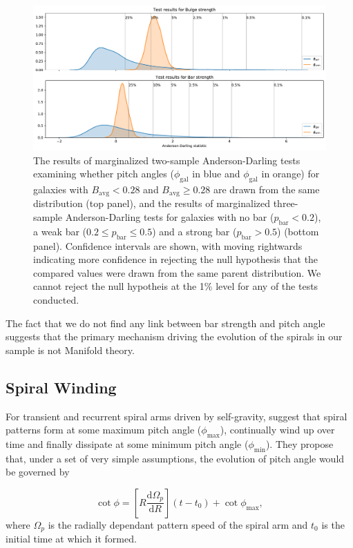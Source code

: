 \begin{figure}
  \includegraphics[width=17.7cm]{plots/bulge_bar_test_results.pdf}
  \caption{The results of marginalized two-sample Anderson-Darling tests examining whether pitch angles ($\phi_\mathrm{gal}$ in blue and $\phi_\mathrm{gal}$ in orange) for galaxies with $B_\mathrm{avg} < 0.28$ and $B_\mathrm{avg} \ge 0.28$ are drawn from the same distribution (top panel), and the results of marginalized three-sample Anderson-Darling tests for galaxies with no bar ($p_\mathrm{bar} < 0.2$), a weak bar ($0.2 \le p_\mathrm{bar} \le 0.5$) and a strong bar ($p_\mathrm{bar} > 0.5$) (bottom panel). Confidence intervals are shown, with moving rightwards indicating more confidence in rejecting the null hypothesis that the compared values were drawn from the same parent distribution. We cannot reject the null hypotheis at the 1\% level for any of the tests conducted.}
  \label{fig:ad-morphology-test}
\end{figure}

The fact that we do not find any link between bar strength and pitch angle suggests that the primary mechanism driving the evolution of the spirals in our sample is not Manifold theory.

\subsection{Spiral Winding}
\label{section:spiral_winding}

For transient and recurrent spiral arms driven by self-gravity, \citet{2019arXiv190910291P} suggest that spiral patterns form at some maximum pitch angle ($\phi_\mathrm{max}$), continually wind up over time and finally dissipate at some minimum pitch angle ($\phi_\mathrm{min}$). They propose that, under a set of very simple assumptions, the evolution of pitch angle would be governed by

\begin{equation}
  \label{eq:winding}
  \cot{\phi} = \left[R\frac{\mathrm{d}\Omega_p}{\mathrm{d}R}\right](t - t_0) + \cot{\phi_\mathrm{max}},
\end{equation}
where $\Omega_p$ is the radially dependant pattern speed of the spiral arm and $t_0$ is the initial time at which it formed.

